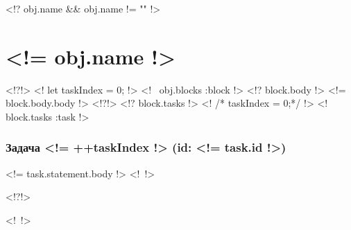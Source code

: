 \documentclass[<!= f.optionsToString(f.documentClassOptions(pars)) !>]{article}
\begin{document}
    <!? obj.name && obj.name != "" !>
        \section*{<!= obj.name !>}
    <!?!>
    <! let taskIndex = 0; !>
    <!~ obj.blocks :block !>
        <!? block.body !>
            <!= block.body.body !>\nopagebreak
        <!?!>
        <!? block.tasks !>
            <! /* taskIndex = 0;*/ !>
            <!~ block.tasks :task !>
                \subsubsection*{Задача \textnumero <!= ++taskIndex !> (id: <!= task.id !>)}
                <!= task.statement.body !>
            <!~!>

        <!?!>
        
    <!~!>
\end{document}
